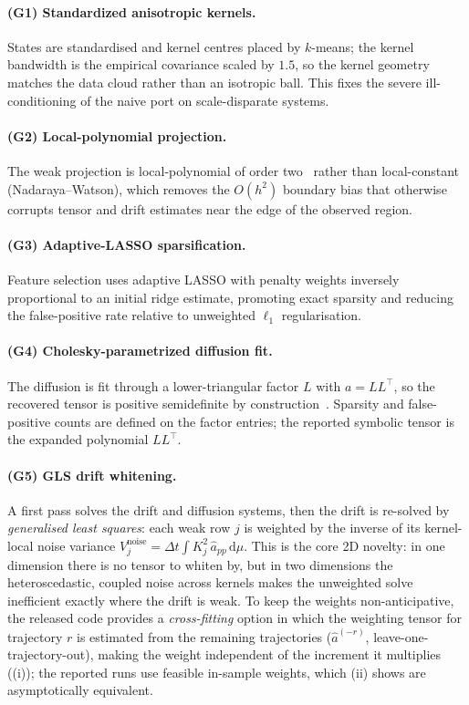 \documentclass[11pt]{article}
\newcommand{\diff}{a}
\newcommand{\Kj}{K_j}
\begin{document}
\paragraph{(G1) Standardized anisotropic kernels.}
States are standardised and kernel centres placed by $k$-means; the kernel bandwidth is the
empirical covariance scaled by $1.5$, so the kernel geometry matches the data cloud rather than
an isotropic ball. This fixes the severe ill-conditioning of the naive port on scale-disparate
systems.

\paragraph{(G2) Local-polynomial projection.}
The weak projection is local-polynomial of order two~\citep{fan1996local} rather than
local-constant (Nadaraya--Watson), which removes the $O(h^2)$ boundary bias that otherwise
corrupts tensor and drift estimates near the edge of the observed region.

\paragraph{(G3) Adaptive-LASSO sparsification.}
Feature selection uses adaptive LASSO with penalty weights inversely proportional to an initial
ridge estimate, promoting exact sparsity and reducing the false-positive rate relative to
unweighted $\ell_1$ regularisation.

\paragraph{(G4) Cholesky-parametrized diffusion fit.}
The diffusion is fit through a lower-triangular factor $L$ with $\diff=LL^\top$, so the
recovered tensor is positive semidefinite by construction~\citep{ledoit2004well}. Sparsity and
false-positive counts are defined on the factor entries; the reported symbolic tensor is the
expanded polynomial $LL^\top$.

\paragraph{(G5) GLS drift whitening.}
A first pass solves the drift and diffusion systems, then the drift is re-solved by
\emph{generalised least squares}: each weak row $j$ is weighted by the inverse of its
kernel-local noise variance
$V^{\mathrm{noise}}_j=\Delta t\int \Kj^2\,\hat\diff_{pp}\,\mathrm{d}\mu$. This is the core 2D
novelty: in one dimension there is no tensor to whiten by, but in two dimensions the
heteroscedastic, coupled noise across kernels makes the unweighted solve inefficient exactly
where the drift is weak. To keep the weights non-anticipative, the released code provides a
\emph{cross-fitting} option in which the weighting tensor for trajectory $r$ is estimated from
the remaining trajectories ($\hat\diff^{(-r)}$, leave-one-trajectory-out), making the weight
independent of the increment it multiplies ((i)); the reported runs use
feasible in-sample weights, which (ii) shows are asymptotically equivalent.
\end{document}
